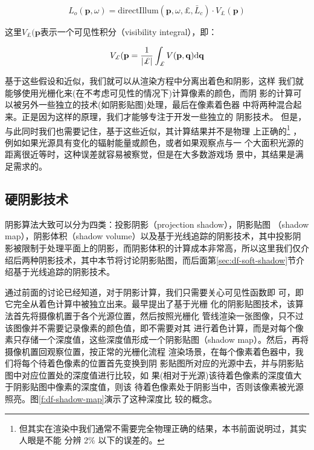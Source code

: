 \begin{equation}
	L_{o}(\mathbf{p},\omega)=\text{directIllum}(\mathbf{p},\omega,\pounds,\bar{L}_{c})\cdot V_{\pounds}(\mathbf{p})
\end{equation}

\noindent 这里$V_{\pounds}(\mathbf{p}$表示一个可见性积分（visibility integral），即：

\begin{equation}
	V_{\pounds}(\mathbf{p}=\frac{1}{|\pounds|}\int_{\pounds}V(\mathbf{p},\mathbf{q}){\rm d}\mathbf{q}
\end{equation}  

基于这些假设和近似，我们就可以从渲染方程中分离出着色和阴影，这样 我们就能够使用光栅化来(在不考虑可见性的情况下)计算像素的颜色，而阴 影的计算可以被另外一些独立的技术(如阴影贴图)处理，最后在像素着色器 中将两种混合起来。正是因为这样的原理，我们才能够专注于开发一些独立的 阴影技术。
但是，与此同时我们也需要记住，基于这些近似，其计算结果并不是物理 上正确的\footnote{但其实在渲染中我们通常不需要完全物理正确的结果，本书前面说明过，其实人眼是不能 分辨 2\% 以下的误差的。} ，例如如果光源具有变化的辐射能量或颜色，或者如果观察点与一 个大面积光源的距离很近等时，这种误差就容易被察觉，但是在大多数游戏场 景中，其结果是满足需求的。



\subsection{硬阴影技术}\label{sec:df-hard-shadow}
阴影算法大致可以分为四类：投影阴影（projection shadow），阴影贴图 （shadow map），阴影体积（shadow volume）以及基于光线追踪的阴影技术，其中投影阴影被限制于处理平面上的阴影，而阴影体积的计算成本非常高，所以这里我们仅介绍后两种阴影技术，其中本节将讨论阴影贴图，而后面第\ref{sec:df-soft-shadow}节介绍基于光线追踪的阴影技术。

通过前面的讨论已经知道，对于阴影计算，我们只需要关心可见性函数即 可，即它完全从着色计算中被独立出来。\cite{a:Castingcurvedshadowsoncurvedsurfaces}最早提出了基于光栅 化的阴影贴图技术，该算法首先将摄像机置于各个光源位置，然后按照光栅化 管线渲染一张图像，只不过该图像并不需要记录像素的颜色值，即不需要对其 进行着色计算，而是对每个像素只存储一个深度值，这些深度值形成一个阴影贴图（shadow map）。然后，再将摄像机置回观察位置，按正常的光栅化流程 渲染场景，在每个像素着色器中，我们将每个待着色像素的位置首先变换到阴 影贴图所对应的光源中去，并与阴影贴图中对应位置处的深度值进行比较，如 果(相对于光源)该待着色像素的深度值大于阴影贴图中像素的深度值，则该 待着色像素处于阴影当中，否则该像素被光源照亮。图\ref{f:df-shadow-map}演示了这种深度比 较的概念。

